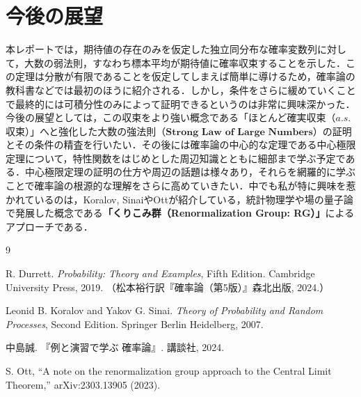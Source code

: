 \documentclass[dvipdfmx]{jsarticle}
\numberwithin{equation}{section}
\theoremstyle{definition}
\newcommand{\0}{\bm{0}}
\newcommand{\1}{\bm{1}}
\begin{document}
\section{今後の展望}
本レポートでは，期待値の存在のみを仮定した独立同分布な確率変数列に対して，大数の弱法則，すなわち標本平均が期待値に確率収束することを示した．この定理は分散が有限であることを仮定してしまえば簡単に導けるため，確率論の教科書などでは最初のほうに紹介される．しかし，条件をさらに緩めていくことで最終的には可積分性のみによって証明できるというのは非常に興味深かった．今後の展望としては，この収束をより強い概念である「ほとんど確実収束（$a.s.$ 収束）」へと強化した$\textbf{大数の強法則（Strong Law of Large Numbers）}$の証明とその条件の精査を行いたい．その後には確率論の中心的な定理である中心極限定理について，特性関数をはじめとした周辺知識とともに細部まで学ぶ予定である．中心極限定理の証明の仕方や周辺の話題は様々あり，それらを網羅的に学ぶことで確率論の根源的な理解をさらに高めていきたい．中でも私が特に興味を惹かれているのは，Koralov, Sinai\cite{koralov2007}やOtt\cite{ott2023note}が紹介している，統計物理学や場の量子論で発展した概念である\textbf{「くりこみ群（Renormalization Group: RG）」}によるアプローチである．

\begin{thebibliography}{9}

R. Durrett. {\it Probability: Theory and Examples}, Fifth Edition. Cambridge University Press, 2019. （松本裕行訳『確率論（第5版）』森北出版, 2024.）

Leonid B. Koralov and Yakov G. Sinai. {\it Theory of Probability and Random Processes}, Second Edition. Springer Berlin Heidelberg, 2007.

中島誠. 『例と演習で学ぶ 確率論』. 講談社, 2024.

S. Ott, ``A note on the renormalization group approach to the Central Limit Theorem,'' arXiv:2303.13905 (2023).

\end{thebibliography}
\end{document}
